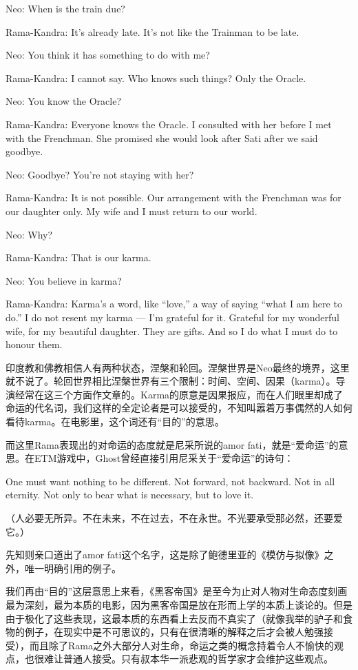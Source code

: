 \documentclass[UTF8]{ctexart}
\newenvironment{myquote}{\color{green} \setlength{\leftskip}{6em} \setlength{\rightskip}{4em} \setlength{\parindent}{-2em}}{\par}
\begin{document}
\begin{myquote}
Neo: When is the train due?

Rama-Kandra: It's already late. It's not like the Trainman to be late.

Neo: You think it has something to do with me?

Rama-Kandra: I cannot say. Who knows such things? Only the Oracle.

Neo: You know the Oracle?

Rama-Kandra: Everyone knows the Oracle. I consulted with her before I met with the Frenchman. She promised she would look after Sati after we said goodbye.

Neo: Goodbye? You're not staying with her?

Rama-Kandra: It is not possible. Our arrangement with the Frenchman was for our daughter only. My wife and I must return to our world.

Neo: Why?

Rama-Kandra: That is our karma.

Neo: You believe in karma?

Rama-Kandra: Karma's a word, like ``love,'' a way of saying ``what I am here to do.'' I do not resent my karma --- I'm grateful for it. Grateful for my wonderful wife, for my beautiful daughter. They are gifts. And so I do what I must do to honour them.
\end{myquote}

印度教和佛教相信人有两种状态，涅槃和轮回。涅槃世界是Neo最终的境界，这里就不说了。轮回世界相比涅槃世界有三个限制：时间、空间、因果（karma）。导演经常在这三个方面作文章的。Karma的原意是因果报应，而在人们眼里却成了命运的代名词，我们这样的全定论者是可以接受的，不知叫嚣着万事偶然的人如何看待karma。在电影里，这个词还有“目的”的意思。

而这里Rama表现出的对命运的态度就是尼采所说的amor fati，就是“爱命运”的意思。在ETM游戏中，Ghost曾经直接引用尼采关于“爱命运”的诗句：

One must want nothing to be different. Not forward, not backward. Not in all eternity. Not only to bear what is necessary, but to love it.

（人必要无所异。不在未来，不在过去，不在永世。不光要承受那必然，还要爱它。）

先知则亲口道出了amor fati这个名字，这是除了鲍德里亚的《模仿与拟像》之外，唯一明确引用的例子。

我们再由“目的”这层意思上来看，《黑客帝国》是至今为止对人物对生命态度刻画最为深刻，最为本质的电影，因为黑客帝国是放在形而上学的本质上谈论的。但是由于极化了这些表现，这最本质的东西看上去反而不真实了（就像我举的驴子和食物的例子，在现实中是不可思议的，只有在很清晰的解释之后才会被人勉强接受），而且除了Rama之外大部分人对生命，命运之类的概念持着令人不愉快的观点，也很难让普通人接受。只有叔本华一派悲观的哲学家才会维护这些观点。
\end{document}
